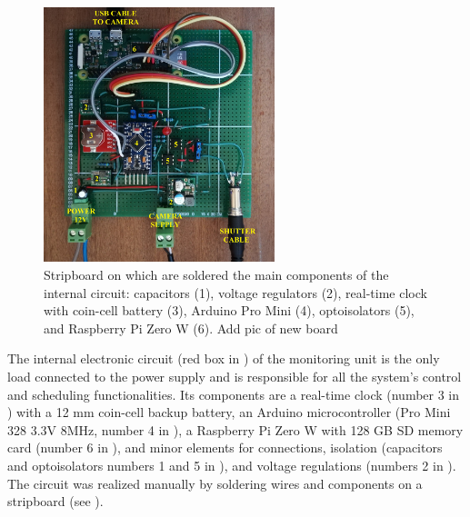 \begin{figure}[ht!]
  \centering
  \includegraphics[width=0.6\textwidth]{board.jpg}
  \caption{Stripboard on which are soldered the main components of the internal
    circuit: capacitors (1), voltage regulators (2), real-time clock with coin-cell
    battery (3), Arduino Pro Mini (4), optoisolators (5), and Raspberry Pi Zero W (6).
      {\color{red} Add pic of new board}}
  \label{fig:4:circuit}
\end{figure}

The internal electronic circuit (red box in ) of the
monitoring unit is the only load connected to the power supply and is responsible for all
the system's control and scheduling functionalities.
Its components are a real-time clock (number 3 in ) with a 12
mm
coin-cell backup battery, an Arduino microcontroller (Pro  Mini 328 3.3V 8MHz, number 4
in ), a Raspberry Pi Zero W with 128 GB SD memory card (number
6
in ), and minor elements for connections, isolation (capacitors
and optoisolators numbers 1 and 5 in ), and voltage regulations
(numbers 2 in ).
The circuit was realized manually by soldering wires and components on a stripboard (see
).

